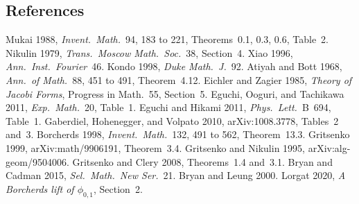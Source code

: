 \subsection*{References}

Mukai 1988, \emph{Invent.\ Math.}~94, 183 to 221, Theorems~0.1, 0.3,
0.6, Table~2.
Nikulin 1979, \emph{Trans.\ Moscow Math.\ Soc.}~38, Section~4.
Xiao 1996, \emph{Ann.\ Inst.\ Fourier}~46.
Kondo 1998, \emph{Duke Math.\ J.}~92.
Atiyah and Bott 1968, \emph{Ann.\ of Math.}~88, 451 to 491,
Theorem~4.12.
Eichler and Zagier 1985, \emph{Theory of Jacobi Forms}, Progress in
Math.~55, Section~5.
Eguchi, Ooguri, and Tachikawa 2011, \emph{Exp.\ Math.}~20, Table~1.
Eguchi and Hikami 2011, \emph{Phys.\ Lett.}~B~694, Table~1.
Gaberdiel, Hohenegger, and Volpato 2010, arXiv:1008.3778, Tables~2
and~3.
Borcherds 1998, \emph{Invent.\ Math.}~132, 491 to 562,
Theorem~13.3.
Gritsenko 1999, arXiv:math/9906191, Theorem~3.4.
Gritsenko and Nikulin 1995, arXiv:alg-geom/9504006.
Gritsenko and Clery 2008, Theorems~1.4 and~3.1.
Bryan and Cadman 2015, \emph{Sel.\ Math.\ New Ser.}~21.
Bryan and Leung 2000.
Lorgat 2020, \emph{A Borcherds lift of $\phi_{0,1}$}, Section~2.
